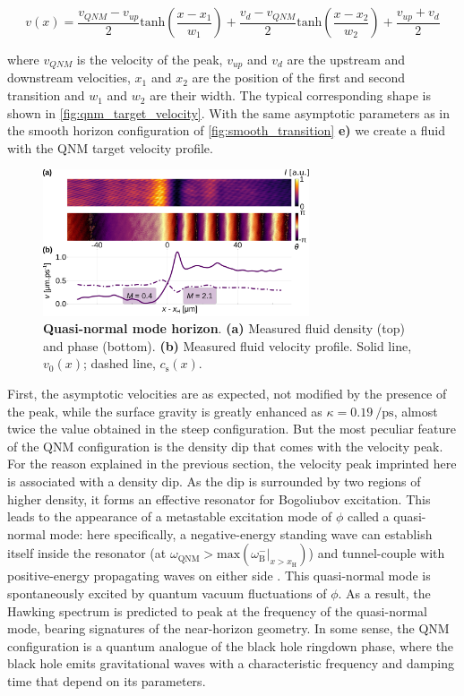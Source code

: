 \begin{equation}
    v(x)= \frac{v_{QNM}-v_{up}}{2}\mathrm{tanh}(\frac{x-x_1}{w_1})+ \frac{v_{d}-v_{QNM}}{2}\mathrm{tanh}(\frac{x-x_2}{w_2})+\frac{v_{up}+v_{d}}{2}
    \label{eq:target_velocity_qnm}
\end{equation}

where $v_{QNM}$ is the velocity of the peak, $v_{up}$ and $v_{d}$ are the upstream and downstream velocities, $x_1$ and $x_2$ are the position of the first and second transition and $w_1$ and $w_2$ are their width.
The typical corresponding shape is shown in \autoref{fig:qnm_target_velocity}.
With the same asymptotic parameters as in the smooth horizon configuration of \autoref{fig:smooth_transition} \textbf{e)} we create a fluid with the QNM target velocity profile.
\begin{figure}
    \centering
    \includegraphics[width=0.7\textwidth]{chap_custom_st/fig/bh_qnm.pdf}
    \caption{\textbf{Quasi-normal mode horizon}.    
    \textbf{(a)} Measured fluid density (top) and phase (bottom).
    \textbf{(b)} Measured fluid velocity profile.
    Solid line, $v_0(x)$; dashed line, $c_\mathrm{s}(x)$.}
    \label{fig:bh_qnm}
\end{figure}

First, the asymptotic velocities are as expected, not modified by the presence of the peak, while the surface gravity 
is greatly enhanced as $\kappa = \SI{0.19}{\per \pico \second}$, almost twice the value obtained in the steep configuration.
But the most peculiar feature of the QNM configuration is the density dip that comes with the velocity peak. For the reason explained in the previous section,
the velocity peak imprinted here is associated with a density dip. As the dip is surrounded by two regions of higher density, it forms an effective resonator for Bogoliubov excitation.
This leads to the appearance of a metastable excitation mode of $\phi$ called a quasi-normal mode: here specifically, a negative-energy standing wave can establish itself inside the resonator (at $\omega_\mathrm{QNM}>\mathrm{max}(\omega_\mathrm{B}^-|_{x>x_\mathrm{H}})$) and tunnel-couple with positive-energy propagating waves on either side \cite{jacquet_quantum_2023}.
This quasi-normal mode is spontaneously excited by quantum vacuum fluctuations of $\phi$.
As a result, the Hawking spectrum is predicted to peak at the frequency of the quasi-normal mode, bearing signatures of the near-horizon geometry. 
In some sense, the QNM configuration is a quantum analogue of the black hole ringdown phase, where the black hole emits gravitational waves with a characteristic frequency and damping time \cite{brito_gravitational_2015} that depend on its parameters. 


